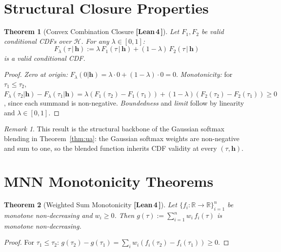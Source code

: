 \documentclass[11pt]{article}
\newtheorem{theorem}{Theorem}[section]
\theoremstyle{remark}
\newtheorem{remark}{Remark}[section]
\newcommand{\verified}{%
  \textcolor{green!60!black}{\textbf{[Lean\,4\,\checkmark]}}}
\newcommand{\R}{\mathbb{R}}
\newcommand{\cH}{\mathcal{H}}
\newcommand{\hhat}{\boldsymbol{h}}
\begin{document}
\section{Structural Closure Properties}

\begin{theorem}[Convex Combination Closure \verified{}]
\label{thm:convex-comb}
Let $F_1, F_2$ be valid conditional CDFs over $\cH$.
For any $\lambda \in [0,1]$:
\[
  F_\lambda(\tau\,|\,\hhat)
  := \lambda\, F_1(\tau\,|\,\hhat) + (1-\lambda)\, F_2(\tau\,|\,\hhat)
\]
is a valid conditional CDF.
\end{theorem}

\begin{proof}
\emph{Zero at origin:} $F_\lambda(0|\hhat) = \lambda\cdot 0 + (1-\lambda)\cdot 0 = 0$.
\emph{Monotonicity:} for $\tau_1 \leq \tau_2$,
$F_\lambda(\tau_2|\hhat) - F_\lambda(\tau_1|\hhat)
  = \lambda(F_1(\tau_2)-F_1(\tau_1)) + (1-\lambda)(F_2(\tau_2)-F_2(\tau_1)) \geq 0$,
since each summand is non-negative.
\emph{Boundedness} and \emph{limit} follow by linearity and $\lambda \in [0,1]$.
\end{proof}

\begin{remark}
This result is the structural backbone of the Gaussian softmax blending in
Theorem~\ref{thm:ua}: the Gaussian softmax weights are non-negative and sum to one,
so the blended function inherits CDF validity at every $(\tau,\hhat)$.
\end{remark}

\section{MNN Monotonicity Theorems}

\begin{theorem}[Weighted Sum Monotonicity \verified{}]
\label{thm:weighted-sum}
Let $\{f_i : \R \to \R\}_{i=1}^n$ be monotone non-decreasing and $w_i \geq 0$.
Then $g(\tau) := \sum_{i=1}^n w_i\, f_i(\tau)$ is monotone non-decreasing.
\end{theorem}

\begin{proof}
For $\tau_1 \leq \tau_2$:
$g(\tau_2) - g(\tau_1) = \sum_i w_i(f_i(\tau_2) - f_i(\tau_1)) \geq 0$.
\end{proof}
\end{document}
